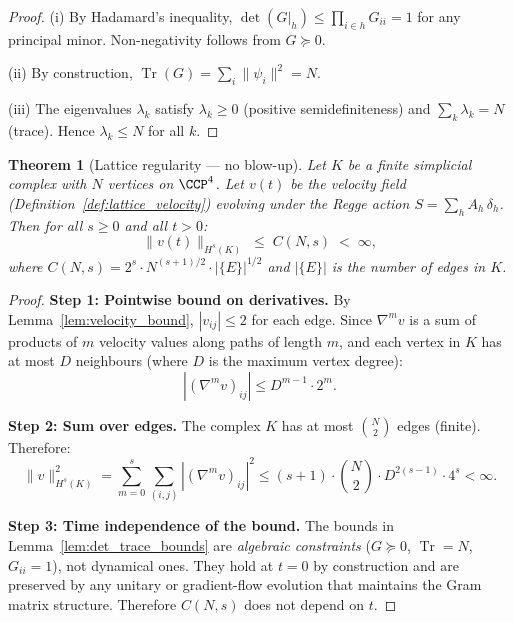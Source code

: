 \documentclass[12pt]{article}
\newtheorem{theorem}{Theorem}[section]
\theoremstyle{remark}
\theoremstyle{definition}
\newcommand{\tr}{\operatorname{Tr}}
\begin{document}
\begin{proof}
(i) By Hadamard's inequality, $\det(G|_h) \leq \prod_{i \in h} G_{ii}
= 1$ for any principal minor.  Non-negativity follows from
$G \succeq 0$.

(ii) By construction, $\tr(G) = \sum_i \|\psi_i\|^2 = N$.

(iii) The eigenvalues $\lambda_k$ satisfy $\lambda_k \geq 0$
(positive semidefiniteness) and $\sum_k \lambda_k = N$ (trace).
Hence $\lambda_k \leq N$ for all $k$.
\end{proof}

\begin{theorem}[Lattice regularity --- no blow-up]
\label{thm:lattice_regularity}
Let $K$ be a finite simplicial complex with $N$ vertices on $\CCP^4$.
Let $v(t)$ be the velocity field (Definition~\ref{def:lattice_velocity})
evolving under the Regge action $S = \sum_h A_h\,\delta_h$.
Then for all $s \geq 0$ and all $t > 0$:
\begin{equation}
\boxed{\|v(t)\|_{H^s(K)} \;\leq\; C(N, s) \;<\; \infty,}
\end{equation}
where $C(N,s) = 2^s \cdot N^{(s+1)/2} \cdot |\{E\}|^{1/2}$ and
$|\{E\}|$ is the number of edges in $K$.
\end{theorem}

\begin{proof}
\textbf{Step 1: Pointwise bound on derivatives.}
By Lemma~\ref{lem:velocity_bound}, $|v_{ij}| \leq 2$ for each edge.
Since $\nabla^m v$ is a sum of products of $m$ velocity values along
paths of length $m$, and each vertex in $K$ has at most $D$ neighbours
(where $D$ is the maximum vertex degree):
\begin{equation}
|(\nabla^m v)_{ij}| \leq D^{m-1} \cdot 2^m.
\end{equation}

\textbf{Step 2: Sum over edges.}
The complex $K$ has at most $\binom{N}{2}$ edges (finite).  Therefore:
\begin{equation}
\|v\|_{H^s(K)}^2 = \sum_{m=0}^{s} \sum_{(i,j)} |(\nabla^m v)_{ij}|^2
\leq (s+1) \cdot \binom{N}{2} \cdot D^{2(s-1)} \cdot 4^s < \infty.
\end{equation}

\textbf{Step 3: Time independence of the bound.}
The bounds in Lemma~\ref{lem:det_trace_bounds} are
\emph{algebraic constraints} ($G \succeq 0$, $\tr = N$, $G_{ii} = 1$),
not dynamical ones.  They hold at $t = 0$ by construction and are
preserved by any unitary or gradient-flow evolution that maintains the
Gram matrix structure.  Therefore $C(N,s)$ does not depend on $t$.
\end{proof}
\end{document}
